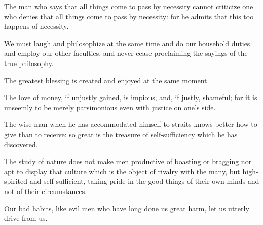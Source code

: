 \documentclass{stex}
\begin{document}
\vspace{0.5em}
\begin{sparagraph}[title=40]
  The man who says that all things come to pass by necessity cannot criticize one who denies that all things come to pass by necessity: for he admits that this too happens of necessity.
\end{sparagraph}

\vspace{0.5em}
\begin{sparagraph}[title=41]
  We must laugh and philosophize at the same time and do our household duties and employ our other faculties, and never cease proclaiming the sayings of the true philosophy.
\end{sparagraph}

\vspace{0.5em}
\begin{sparagraph}[title=42]
  The greatest blessing is created and enjoyed at the same moment.
\end{sparagraph}

\vspace{0.5em}
\begin{sparagraph}[title=43]
  The love of money, if unjustly gained, is impious, and, if justly, shameful; for it is unseemly to be merely parsimonious even with justice on one's side.
\end{sparagraph}

\vspace{0.5em}
\begin{sparagraph}[title=44]
  The wise man when he has accommodated himself to straits knows better how to give than to receive: so great is the treasure of self-sufficiency which he has discovered.
\end{sparagraph}

\vspace{0.5em}
\begin{sparagraph}[title=45]
  The study of nature does not make men productive of boasting or bragging nor apt to display that culture which is the object of rivalry with the many, but high-spirited and self-sufficient, taking pride in the good things of their own minds and not of their circumstances.
\end{sparagraph}

\vspace{0.5em}
\begin{sparagraph}[title=46]
  Our bad habits, like evil men who have long done us great harm, let us utterly drive from us.
\end{sparagraph}
\end{document}
